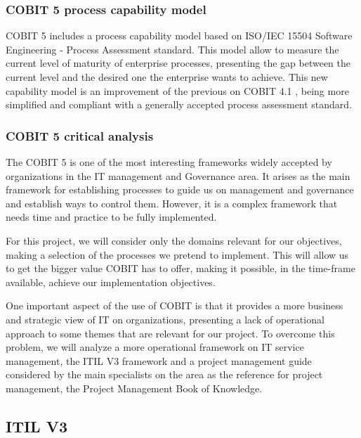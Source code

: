 \subsubsection{COBIT 5 process capability model}

COBIT 5 includes a process capability model based on ISO/IEC 15504 Software Engineering - Process Assessment standard.\cite{ISO15504} This model allow to measure the current level of maturity of enterprise processes, presenting the gap between the current level and the desired one the enterprise wants to achieve. This new capability model is an improvement of the previous on COBIT 4.1 \cite{cobit4}, being more simplified and compliant with a generally accepted process assessment standard.\par


\subsubsection{COBIT 5 critical analysis}

The COBIT 5 is one of the most interesting frameworks widely accepted by organizations in the IT management and Governance area. It arises as the main framework for establishing processes to guide us on management and governance and establish ways to control them. However, it is a complex framework that needs time and practice to be fully implemented.\par
For this project, we will consider only the domains relevant for our objectives, making a selection of the processes we pretend to implement. This will allow us to get the bigger value COBIT has to offer, making it possible, in the time-frame available, achieve our implementation objectives.\par
One important aspect of the use of COBIT is that it provides a more business and strategic view of IT on organizations, presenting a lack of operational approach to some themes that are relevant for our project. To overcome this problem, we will analyze a more operational framework on IT service management, the ITIL V3 framework\cite{itilIntro,itilSS,itilST,itilSD,itilSO,itilCSI} and a project management guide considered by the main specialists on the area as the reference for project management, the Project Management Book of Knowledge\cite{pmbok5}.\par


\subsection{ITIL V3}

